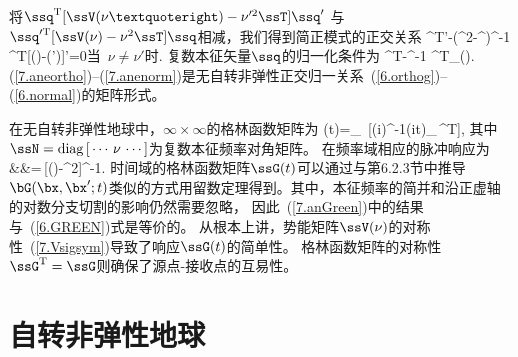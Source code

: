 将$\ssq^{\rm T}[\ssV(\nu’)-\nu^{\prime 2}\ssT]\ssq'$
与$\ssq^{\prime{\rm T}}[\ssV(\nu)-\nu^2\ssT]\ssq$相减，我们得到简正模式的正交关系
%
\eq
\label{7.aneortho}
\ssq^{\rm T}\ssT\ssq'-(\nu^2-\nu^{})^{-1}
\ssq^{\rm T}[\ssV(\nu)-\ssV(\nu')]\ssq'=0\quad\mbox{当 $\nu\neq\nu'$时}.
\en
复数本征矢量$\ssq$的归一化条件为
%
\eq
\label{7.anenorm}
\ssq^{\rm T}\ssT\ssq-\half\nu^{-1}
\ssq^{\rm T}\p_{\nu}\ssV(\nu).
\en
(\ref{7.aneortho})--(\ref{7.anenorm})是无自转非弹性正交归一关系~(\ref{6.orthog})--(\ref{6.normal})的矩阵形式。

在无自转非弹性地球中，$\infty\times\infty$的格林函数矩阵为
%
%
\eq
\label{7.anGreen}
\ssG(t)=_{\,}
[\ssQ(i\ssN)^{-1}\exp(i\ssN t)_{\,}\ssQ^{\rm T}],
\en
其中$\ssN={\rm diag}\,[\,\cdots\,\nu\,\cdots\,]$为复数本征频率对角矩阵。
在频率域相应的脉冲响应为
\eqa
\label{7.anOmGreen}
 \nonumber \\
&&\mbox{}=\,[\ssV(\nu)-\nu^2\ssT]^{-1}.
\ena
时间域的格林函数矩阵$\ssG(t)$可以通过与第6.2.3节中推导$\bG(\bx,\bx';t)$类似的方式用留数定理得到。其中，本征频率的简并和沿正虚轴的对数分支切割的影响仍然需要忽略，
%
%
因此~(\ref{7.anGreen})中的结果与~(\ref{6.GREEN})式是等价的。
从根本上讲，势能矩阵$\ssV(\nu)$的对称性~(\ref{7.Vsigsym})导致了响应$\ssG(t)$的简单性。
格林函数矩阵的对称性$\ssG^{\rm T}=\ssG$则确保了源点-接收点的互易性。
%
%
%

\renewcommand{\thesection}{$\!\!\!\raise1.3ex\hbox{$\star$}\!\!$
\arabic{chapter}.\arabic{section}}
\section{自转非弹性地球}
%
%
\label{7.sec.rotane}
\renewcommand{\thesection}{\arabic{chapter}.\arabic{section}}

